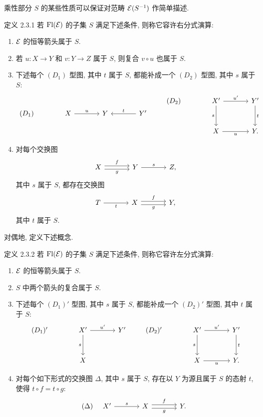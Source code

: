 乘性部分 $S$ 的某些性质可以保证对范畴 $\mathcal E(S^{-1})$ 作简单描述.

\begin{statement}{定义 2.3.1}
若 $\operatorname{Fl}(\mathcal E)$ 的子集 $S$ 满足下述条件, 则称它容许右分式演算:
\begin{enumerate}[label=(\alph*)]
\item $\mathcal E$ 的恒等箭头属于 $S$.
\item 若 $u:X\to Y$ 和 $v:Y\to Z$ 属于 $S$, 则复合 $v\circ u$ 也属于 $S$.
\item 下述每个 $(D_1)$ 型图, 其中 $t$ 属于 $S$, 都能补成一个 $(D_2)$ 型图, 其中 $s$ 属于 $S$:
\[
\begin{tikzcd}[column sep=large]
(D_1)& X \arrow[r,"u"] & Y & Y' \arrow[l,"t"']
\end{tikzcd}
\qquad
\begin{tikzcd}[column sep=large,row sep=large]
(D_2)& X' \arrow[r,"u'"] \arrow[d,"s"'] & Y' \arrow[d,"t"]\\
& X \arrow[r,"u"'] & Y .
\end{tikzcd}
\]
\item 对每个交换图
\[
\begin{tikzcd}[column sep=large]
X \arrow[r,shift left,"f"] \arrow[r,shift right,"g"'] & Y \arrow[r,"s"] & Z,
\end{tikzcd}
\]
其中 $s$ 属于 $S$, 都存在交换图
\[
\begin{tikzcd}[column sep=large]
T \arrow[r,"t"'] & X \arrow[r,shift left,"f"] \arrow[r,shift right,"g"'] & Y,
\end{tikzcd}
\]
其中 $t$ 属于 $S$.
\end{enumerate}
\end{statement}

对偶地, 定义下述概念.

\begin{statement}{定义 2.3.2}
若 $\operatorname{Fl}(\mathcal E)$ 的子集 $S$ 满足下述条件, 则称它容许左分式演算:
\begin{enumerate}[label=(\alph*)]
\item[(a')] $\mathcal E$ 的恒等箭头属于 $S$.
\item[(b')] $S$ 中两个箭头的复合属于 $S$.
\item[(c')] 下述每个 $(D_1)'$ 型图, 其中 $s$ 属于 $S$, 都能补成一个 $(D_2)'$ 型图, 其中 $t$ 属于 $S$:
\[
\begin{tikzcd}[column sep=large,row sep=large]
(D_1)'& X' \arrow[r,"u'"] \arrow[d,"s"'] & Y'\\
& X
\end{tikzcd}
\qquad
\begin{tikzcd}[column sep=large,row sep=large]
(D_2)'& X' \arrow[r,"u'"] \arrow[d,"s"'] & Y' \arrow[d,"t"]\\
& X \arrow[r,"u"'] & Y .
\end{tikzcd}
\]
\item[(d')] 对每个如下形式的交换图 $\Delta$, 其中 $s$ 属于 $S$, 存在以 $Y$ 为源且属于 $S$ 的态射 $t$, 使得 $t\circ f=t\circ g$:
\[
(\Delta)\quad
\begin{tikzcd}[column sep=large]
X' \arrow[r,"s"] & X \arrow[r,shift left,"f"] \arrow[r,shift right,"g"'] & Y .
\end{tikzcd}
\]
\end{enumerate}
\end{statement}


